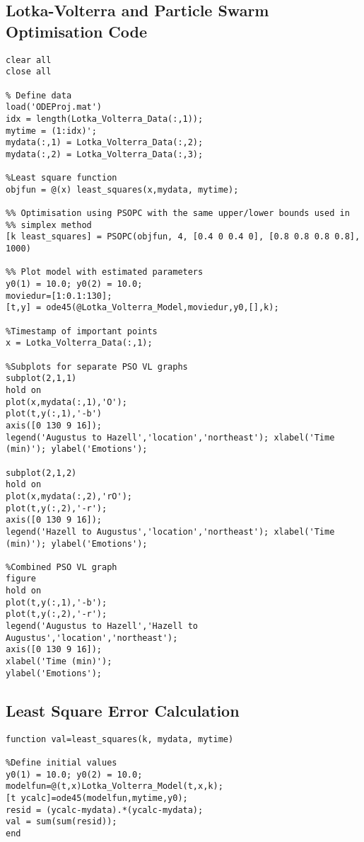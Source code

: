 \documentclass{article}
\begin{document}
\subsection*{Lotka-Volterra and Particle Swarm Optimisation Code}
\begin{lstlisting}[style=Matlab-editor]
clear all
close all

% Define data
load('ODEProj.mat')
idx = length(Lotka_Volterra_Data(:,1));
mytime = (1:idx)';
mydata(:,1) = Lotka_Volterra_Data(:,2);
mydata(:,2) = Lotka_Volterra_Data(:,3);

%Least square function
objfun = @(x) least_squares(x,mydata, mytime);

%% Optimisation using PSOPC with the same upper/lower bounds used in
%% simplex method
[k least_squares] = PSOPC(objfun, 4, [0.4 0 0.4 0], [0.8 0.8 0.8 0.8], 1000)

%% Plot model with estimated parameters
y0(1) = 10.0; y0(2) = 10.0;
moviedur=[1:0.1:130];
[t,y] = ode45(@Lotka_Volterra_Model,moviedur,y0,[],k);

%Timestamp of important points
x = Lotka_Volterra_Data(:,1);

%Subplots for separate PSO VL graphs
subplot(2,1,1)
hold on
plot(x,mydata(:,1),'O');
plot(t,y(:,1),'-b')
axis([0 130 9 16]);
legend('Augustus to Hazell','location','northeast'); xlabel('Time (min)'); ylabel('Emotions');

subplot(2,1,2)
hold on
plot(x,mydata(:,2),'rO');
plot(t,y(:,2),'-r');
axis([0 130 9 16]);
legend('Hazell to Augustus','location','northeast'); xlabel('Time (min)'); ylabel('Emotions');

%Combined PSO VL graph
figure
hold on
plot(t,y(:,1),'-b');
plot(t,y(:,2),'-r');
legend('Augustus to Hazell','Hazell to Augustus','location','northeast');
axis([0 130 9 16]);
xlabel('Time (min)');
ylabel('Emotions');
\end{lstlisting}
\subsection*{Least Square Error Calculation}

\begin{lstlisting}[style=Matlab-editor]
function val=least_squares(k, mydata, mytime)

%Define initial values
y0(1) = 10.0; y0(2) = 10.0;
modelfun=@(t,x)Lotka_Volterra_Model(t,x,k);
[t ycalc]=ode45(modelfun,mytime,y0);
resid = (ycalc-mydata).*(ycalc-mydata);
val = sum(sum(resid));
end
\end{lstlisting}
\end{document}
